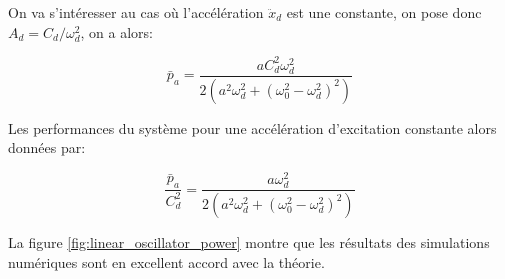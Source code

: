\documentclass[a4paper,11pt,twoside]{article}
\begin{document}
On va s'intéresser au cas où l'accélération $\ddot{x}_d$ est une constante, on pose donc $A_d = C_d / \omega_d^2$, on a alors:

\begin{equation}
\bar p_a = \dfrac{ a C_d^2 \omega_d^2}{2\left(a^2\omega_d^2 + \left( \omega_0^2 - \omega_d^2\right)^2 \right) } 
\end{equation}

Les performances du système pour une accélération d'excitation constante alors données par:

\begin{equation}
\dfrac{\bar p_a}{C_d^2} = \dfrac{ a \omega_d^2}{2\left(a^2\omega_d^2 + \left( \omega_0^2 - \omega_d^2\right)^2 \right) } 
\end{equation}

La figure \ref{fig:linear_oscillator_power} montre que les résultats des simulations numériques sont en excellent accord avec la théorie.
\end{document}
